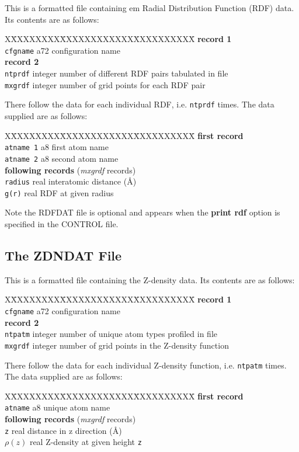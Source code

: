 This is a formatted file containing {em Radial Distribution
Function} (RDF) data.  Its contents are as follows:
\begin{tabbing}
X\=XXXXXXXX\=XXXXXXXXXXXX\=XXXXXXXXXX\=\kill
{\bf record 1} \\
\> {\tt cfgname} \> a72     \> configuration name \\
{\bf record 2} \\
\> {\tt ntprdf}  \> integer \> number of different RDF pairs tabulated in file \\
\> {\tt mxgrdf}  \> integer \> number of grid points for each RDF pair
\end{tabbing}
There follow the data for each individual RDF, i.e. {\tt ntprdf}
times.  The data supplied are as follows:
\begin{tabbing}
X\=XXXXXXXX\=XXXXXXXXXXXX\=XXXXXXXXXX\=\kill
{\bf first record} \\
\> {\tt atname 1} \> a8   \> first atom name \\
\> {\tt atname 2} \> a8   \> second atom name \\
{\bf following records} ({\em mxgrdf} records) \\
\> {\tt radius}   \> real \> interatomic distance (\AA) \\
\> {\tt g(r)}     \> real \> RDF at given radius
\end{tabbing}

Note the RDFDAT file is optional and appears when the {\bf print
rdf} option is specified in the CONTROL file.

\subsection{The ZDNDAT File}
\label{zdn-file}

This is a formatted file containing the Z-density data.  Its
contents are as follows:
\begin{tabbing}
X\=XXXXXXXX\=XXXXXXXXXXXX\=XXXXXXXXXX\=\kill
{\bf record 1} \\
\> {\tt cfgname} \> a72    \> configuration name \\
{\bf record 2} \\
\> {\tt ntpatm}  \> integer \> number of unique atom types profiled in file \\
\> {\tt mxgrdf}  \> integer \> number of grid points in the Z-density function\
\end{tabbing}
There follow the data for each individual Z-density function, i.e.
{\tt ntpatm} times. The data supplied are as follows:
\begin{tabbing}
X\=XXXXXXXX\=XXXXXXXXXXXX\=XXXXXXXXXX\=\kill
{\bf first record} \\
\> {\tt atname}  \> a8      \> unique atom name \\
{\bf following records} ({\em mxgrdf} records) \\
\> {\tt z}       \> real    \> distance in z direction (\AA) \\
\> $\rho(z)$     \> real    \> Z-density at given height {\tt z}
\end{tabbing}

